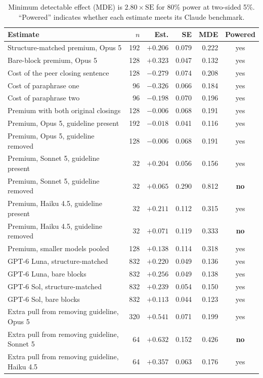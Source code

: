 \begin{table}[H]
\centering
\caption{Minimum detectable effect (MDE) is $2.80\times\mathrm{SE}$ for 80\% power at two-sided
5\%. ``Powered'' indicates whether each estimate meets its Claude benchmark.}
\label{tab:power}
\footnotesize
\renewcommand{\arraystretch}{0.9}
\begin{tabular}{lrrrrc}
\toprule
Estimate & $n$ & Est. & SE & MDE & Powered \\
\midrule
Structure-matched premium, Opus 5 & 192 & $+0.206$ & 0.079 & 0.222 & yes \\
Bare-block premium, Opus 5 & 128 & $+0.323$ & 0.047 & 0.132 & yes \\
Cost of the peer closing sentence & 128 & $-0.279$ & 0.074 & 0.208 & yes \\
Cost of paraphrase one & 96 & $-0.326$ & 0.066 & 0.184 & yes \\
Cost of paraphrase two & 96 & $-0.198$ & 0.070 & 0.196 & yes \\
Premium with both original closings & 128 & $-0.006$ & 0.068 & 0.191 & yes \\
Premium, Opus 5, guideline present & 192 & $-0.018$ & 0.041 & 0.116 & yes \\
Premium, Opus 5, guideline removed & 128 & $-0.006$ & 0.068 & 0.191 & yes \\
Premium, Sonnet 5, guideline present & 32 & $+0.204$ & 0.056 & 0.156 & yes \\
Premium, Sonnet 5, guideline removed & 32 & $+0.065$ & 0.290 & 0.812 & \textbf{no} \\
Premium, Haiku 4.5, guideline present & 32 & $+0.211$ & 0.112 & 0.315 & yes \\
Premium, Haiku 4.5, guideline removed & 32 & $+0.071$ & 0.119 & 0.333 & \textbf{no} \\
Premium, smaller models pooled & 128 & $+0.138$ & 0.114 & 0.318 & yes \\
GPT-6 Luna, structure-matched & 832 & $+0.220$ & 0.049 & 0.136 & yes \\
GPT-6 Luna, bare blocks & 832 & $+0.256$ & 0.049 & 0.138 & yes \\
GPT-6 Sol, structure-matched & 832 & $+0.239$ & 0.054 & 0.150 & yes \\
GPT-6 Sol, bare blocks & 832 & $+0.113$ & 0.044 & 0.123 & yes \\
Extra pull from removing guideline, Opus 5 & 320 & $+0.541$ & 0.071 & 0.199 & yes \\
Extra pull from removing guideline, Sonnet 5 & 64 & $+0.632$ & 0.152 & 0.426 & \textbf{no} \\
Extra pull from removing guideline, Haiku 4.5 & 64 & $+0.357$ & 0.063 & 0.176 & yes \\
\bottomrule
\end{tabular}
\end{table}
